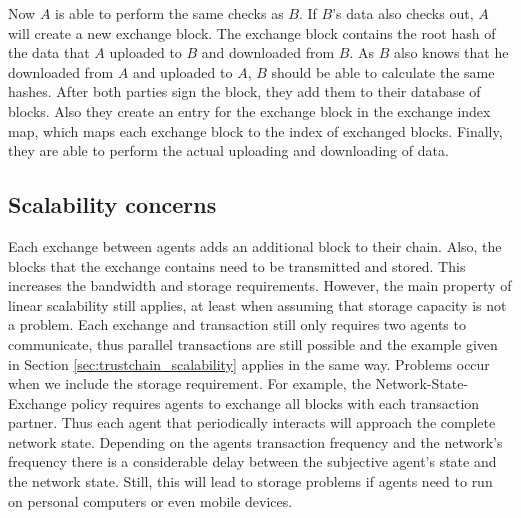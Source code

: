 Now $A$ is able to perform the same checks as $B$. If $B$'s data also checks out, $A$ will create 
a new exchange block. The exchange block contains the root hash of the data that $A$ uploaded to $B$ 
and downloaded from $B$. As $B$ also knows that he downloaded from $A$ and uploaded to $A$, $B$ should
be able to calculate the same hashes. After both parties sign the block, they add them to their 
database of blocks. Also they create an entry for the exchange block in the exchange index map, which 
maps each exchange block to the index of exchanged blocks. Finally, they are able to perform the 
actual uploading and downloading of data. 





\subsection{Scalability concerns}
Each exchange between agents adds an additional block to their chain. Also, the blocks that the 
exchange contains need to be transmitted and stored. This increases the bandwidth and storage 
requirements. However, the main property of linear scalability 
still applies, at least when assuming that storage capacity is not a problem. Each exchange and 
transaction still only requires two agents to communicate, thus parallel transactions are still 
possible and the example given in Section \ref{sec:trustchain_scalability} applies in the same way.
Problems occur when we include the storage requirement. For example, the Network-State-Exchange policy
requires agents to exchange all blocks with each transaction partner. Thus each agent that periodically
interacts will approach the complete network state. Depending on the agents transaction frequency and
the network's frequency there is a considerable delay between the subjective agent's state and the
network state. Still, this will lead to storage problems if agents need to run on personal computers
or even mobile devices.

